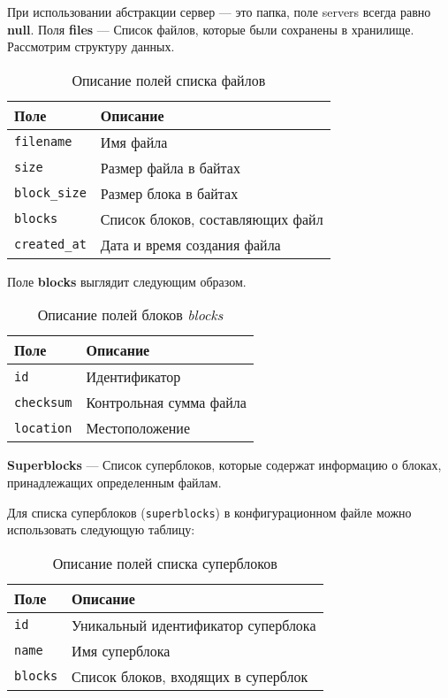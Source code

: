 При использовании абстракции сервер --- это папка, поле servers всегда равно \textbf{null}.  
\newpage
Поля \textbf{files} --- Список файлов, которые были сохранены в хранилище. Рассмотрим структуру данных.

\begin{table}[h]
\centering
\caption{Описание полей списка файлов}
\label{tbl:files}
\begin{tabular}{|p{}|p{}|}
\hline
\textbf{Поле} & \textbf{Описание} \\\hline
\texttt{filename} & Имя файла \\\hline
\texttt{size} & Размер файла в байтах \\\hline
\texttt{block\_size} & Размер блока в байтах \\\hline
\texttt{blocks} & Список блоков, составляющих файл \\\hline
\texttt{created\_at} & Дата и время создания файла \\\hline
\end{tabular}
\end{table} 

Поле \textbf{blocks} выглядит следующим образом.

\begin{table}[h]
\centering
\caption{Описание полей блоков \textit{blocks}}
\label{tbl:blocks}
\begin{tabular}{|p{}|p{}|}
\hline
\textbf{Поле} & \textbf{Описание} \\\hline
\texttt{id} & Идентификатор \\\hline
\texttt{checksum} & Контрольная сумма файла \\\hline
\texttt{location} & Местоположение \\\hline
\end{tabular}
\end{table}


\textbf{Superblocks} --- Список суперблоков, которые содержат информацию о блоках, принадлежащих определенным файлам. 


Для списка суперблоков (\texttt{superblocks}) в конфигурационном файле можно использовать следующую таблицу:

\begin{table}[h]
\centering
\caption{Описание полей списка суперблоков}
\label{tbl:superblocks}
\begin{tabular}{|p{}|p{}|}
\hline
\textbf{Поле} & \textbf{Описание} \\\hline
\texttt{id} & Уникальный идентификатор суперблока \\\hline
\texttt{name} & Имя суперблока \\\hline
\texttt{blocks} & Список блоков, входящих в суперблок \\\hline
\end{tabular}
\end{table}


